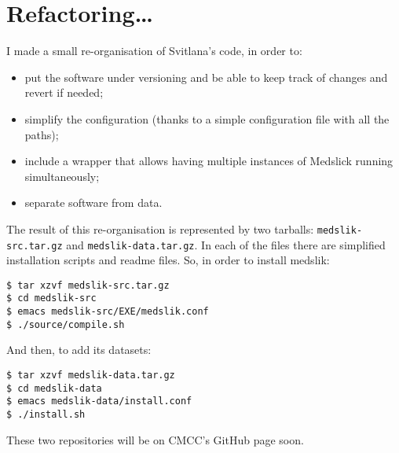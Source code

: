 \section{Refactoring\dots}

I made a small re-organisation of Svitlana's code, in order to:

\begin{itemize}
    \item put the software under versioning and be able to keep track of changes and revert if needed;
    \item simplify the configuration (thanks to a simple configuration file with all the paths);
    \item include a wrapper that allows having multiple instances of Medslick running simultaneously;
    \item separate software from data.
\end{itemize}

The result of this re-organisation is represented by two tarballs: \texttt{medslik-src.tar.gz} and \texttt{medslik-data.tar.gz}. In each of the files there are simplified installation scripts and readme files. So, in order to install medslik:

\begin{lstlisting}
$ tar xzvf medslik-src.tar.gz
$ cd medslik-src
$ emacs medslik-src/EXE/medslik.conf
$ ./source/compile.sh
\end{lstlisting}

And then, to add its datasets:

\begin{lstlisting}
$ tar xzvf medslik-data.tar.gz
$ cd medslik-data
$ emacs medslik-data/install.conf
$ ./install.sh
\end{lstlisting}

These two repositories will be on CMCC's GitHub page soon.